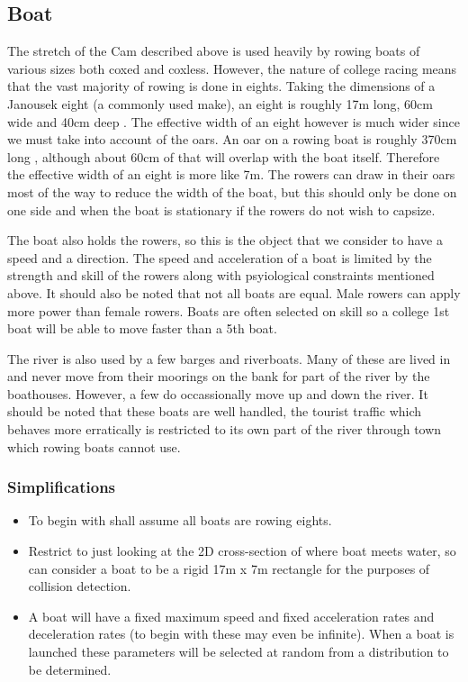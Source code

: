 \subsection{Boat}
The stretch of the Cam described above is used heavily by rowing boats
of various sizes both coxed and coxless. However, the nature of
college racing means that the vast majority of rowing is done in
eights. Taking the dimensions of a Janousek eight (a commonly used
make), an eight is roughly 17m long, 60cm wide and 40cm deep
\cite{Janousek}. The effective width of an eight however is much wider
since we must take into account of the oars. An oar on a rowing boat
is roughly 370cm long \cite{Concept2}, although about 60cm of that
will overlap with the boat itself. Therefore the effective width of an
eight is more like 7m. The rowers can draw in their oars most of the
way to reduce the width of the boat, but this should only be done on
one side and when the boat is stationary if the rowers do not wish to
capsize.

The boat also holds the rowers, so this is the object that we consider
to have a speed and a direction. The speed and acceleration of a boat
is limited by the strength and skill of the rowers along with
psyiological constraints mentioned above. It should also be noted that
not all boats are equal. Male rowers can apply more power than female
rowers. Boats are often selected on skill so a college 1st boat will
be able to move faster than a 5th boat.

The river is also used by a few barges and riverboats. Many of these
are lived in and never move from their moorings on the bank for part
of the river by the boathouses. However, a few do occassionally move
up and down the river. It should be noted that these boats are well
handled, the tourist traffic which behaves more erratically is
restricted to its own part of the river through town which rowing
boats cannot use.


\subsubsection{Simplifications}
\begin{itemize}
  \item To begin with shall assume all boats are rowing eights.
  \item Restrict to just looking at the 2D cross-section of where boat
    meets water, so can consider a boat to be a rigid 17m x 7m rectangle for
    the purposes of collision detection.
  \item A boat will have a fixed maximum speed and fixed acceleration
    rates and deceleration rates (to begin with these may even be
    infinite). When a boat is launched these parameters will be
    selected at random from a distribution to be determined.
\end{itemize}


